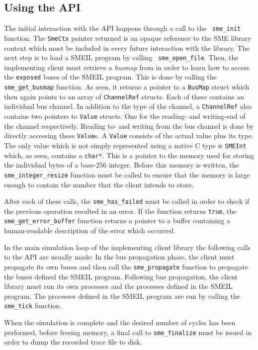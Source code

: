 \subsection{Using the API}
The initial interaction with the API happens through a call to the {\tt
  sme_init} function. The {\tt SmeCtx} pointer returned is an opaque reference
to the SME library context which must be included in every future interaction
with the library. The next step is to load a SMEIL program by calling {\tt
  sme_open_file}. Then, the implementing client must retrieve a {\it busmap}
from \libsme{} in order to learn how to access the {\tt exposed} buses of the
SMEIL program. This is done by calling the {\tt sme_get_busmap} function. As
seen, it returns a pointer to a {\tt BusMap} struct which then again points to
an array of {\tt ChannelRef} structs. Each of these contains an individual bus
channel. In addition to the type of the channel, a {\tt ChannelRef} also
contains two pointers to {\tt Value} structs. One for the reading- and
writing-end of the channel respectively. Reading to- and writing from the bus
channel is done by directly accessing these {\tt Value}s. A {\tt Value} consists
of the actual value plus its type. The only value which is not simply
represented using a native C type is {\tt SMEInt} which, as seen, contains a
{\tt char*}. This is a pointer to the memory used for storing the individual
bytes of a base-256 integer. Before this memory is written, the {\tt
  sme_integer_resize} function must be called to ensure that the memory is large
enough to contain the number that the client intends to store.

After each of these calls, the {\tt sme_has_failed} must be called in order to
check if the previous operation resulted in an error. If the function returns
{\tt true}, the {\tt sme_get_error_buffer} function returns a pointer to a
buffer containing a human-readable description of the error which occurred.

In the main simulation loop of the implementing client library the following
calls to the API are usually made: In the bus propagation phase, the client must
propagate its own buses and then call the {\tt sme_propagate} function to
propagate the buses defined the SMEIL program. Following bus propagation, the
client library must run its own processes and the processes defined in the SMEIL
program. The processes defined in the SMEIL program are run by calling the {\tt
  sme_tick} function.

When the simulation is complete and the desired number of cycles has been
performed, before freeing memory, a final call to {\tt sme_finalize} must be
issued in order to dump the recorded trace file to disk.

